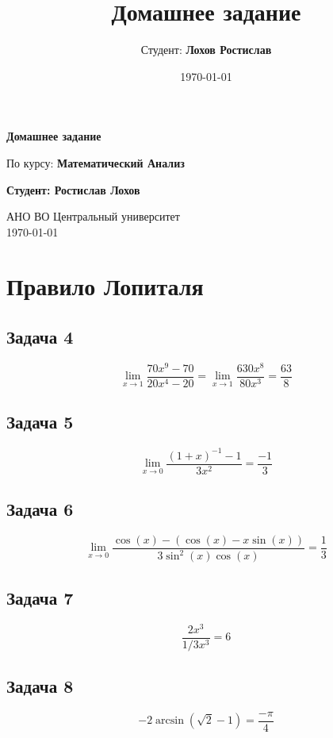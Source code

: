 \documentclass[a4paper,12pt]{article}
\title{Домашнее задание}
\author{Студент: \textbf{Лохов Ростислав}}
\date{\today}
\begin{document}
\begin{titlepage}
    \centering
    \vspace*{1cm}

    \Huge
    \textbf{Домашнее задание}

    \vspace{0.5cm}
    \LARGE
    По курсу: \textbf{Математический Анализ}

    \vspace{1.5cm}

    \textbf{Студент: Ростислав Лохов}

    \vfill

    \Large
    АНО ВО Центральный университет\\
    \vspace{0.3cm}
    \today

\end{titlepage}

\tableofcontents
\newpage

\section{Правило Лопиталя}

\subsection{Задача 4}
\[
\lim_{x \to 1} \frac{70x^9-70}{20x^4-20} = \lim_{x \to 1} \frac{630x^8}{80x^3} = \frac{63}{8}
\]

\subsection{Задача 5}
\[
\lim_{x \to 0} \frac{(1+x)^{-1}-1}{3x^2} = \frac{-1}{3}
\]

\subsection{Задача 6}
\[
\lim_{x \to 0} \frac{\cos(x) - (\cos(x) - x\sin(x))}{3\sin^2(x)\cos(x)} = \frac{1}{3}
\]

\subsection{Задача 7}
\[
\frac{2x^3}{1/3x^3} = 6
\]

\subsection{Задача 8}
\[
-2\arcsin(\sqrt{2}-1) = \frac{-\pi}{4}
\]
\end{document}
